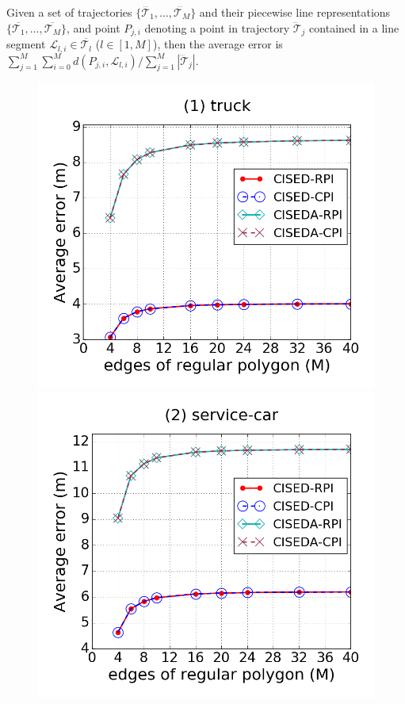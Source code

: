 Given a set of trajectories $\{\dddot{\mathcal{T}_1}, \ldots, \dddot{\mathcal{T}_M}\}$ and their piecewise line representations $\{\overline{\mathcal{T}_1}, \ldots, \overline{\mathcal{T}_M}\}$, and point $P_{j,i}$ denoting
a point in trajectory $\dddot{\mathcal{T}}_j$ contained in a line segment $\mathcal{L}_{l,i}\in\overline{\mathcal{T}_l}$ ($l\in[1,M]$),
then the average error is $\sum_{j=1}^{M}\sum_{i=0}^{M} d(P_{j,i},
\mathcal{L}_{l,i})/\sum_{j=1}^{M}{|\dddot{\mathcal{T}}_j |}$.




\begin{figure}[tb!]
\centering
\includegraphics[scale = 0.245]{figures/Exp-M-e-20-error-truck.png}
\includegraphics[scale = 0.245]{figures/Exp-M-e-20-error-service.png}

\end{figure}
